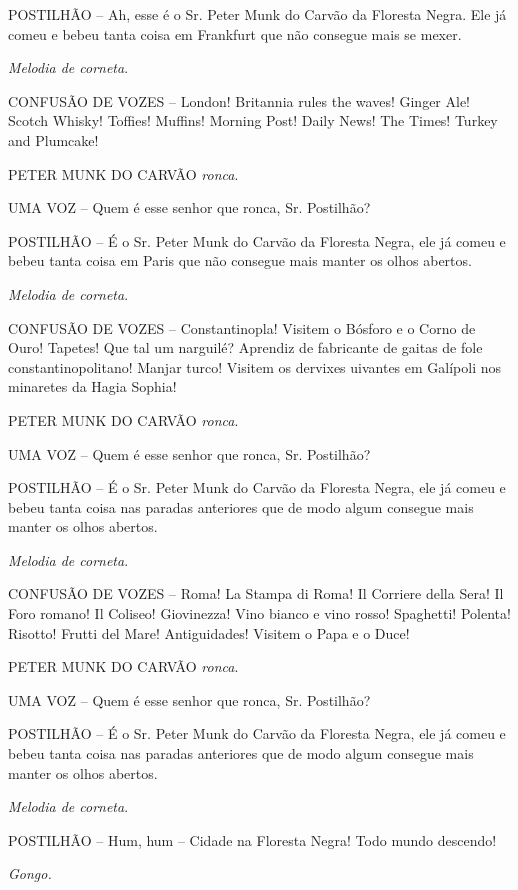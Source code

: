 POSTILHÃO -- Ah, esse é o Sr. Peter Munk do Carvão da Floresta Negra.
Ele já comeu e bebeu tanta coisa em Frankfurt que não consegue mais se
mexer.

\emph{Melodia de corneta}.

CONFUSÃO DE VOZES -- London! Britannia rules the waves! Ginger Ale!
Scotch Whisky! Toffies! Muffins! Morning Post! Daily News! The Times!
Turkey and Plumcake!

PETER MUNK DO CARVÃO \emph{ronca}.

UMA VOZ -- Quem é esse senhor que ronca, Sr. Postilhão?

POSTILHÃO -- É o Sr. Peter Munk do Carvão da Floresta Negra, ele já
comeu e bebeu tanta coisa em Paris que não consegue mais manter os olhos
abertos.

\emph{Melodia de corneta}.

CONFUSÃO DE VOZES -- Constantinopla! Visitem o Bósforo e o Corno de
Ouro! Tapetes! Que tal um narguilé? Aprendiz de fabricante de gaitas de
fole constantinopolitano! Manjar turco! Visitem os dervixes uivantes em
Galípoli nos minaretes da Hagia Sophia!

PETER MUNK DO CARVÃO \emph{ronca}.

UMA VOZ -- Quem é esse senhor que ronca, Sr. Postilhão?

POSTILHÃO -- É o Sr. Peter Munk do Carvão da Floresta Negra, ele já
comeu e bebeu tanta coisa nas paradas anteriores que de modo algum
consegue mais manter os olhos abertos.

\emph{Melodia de corneta}.

CONFUSÃO DE VOZES -- Roma! La Stampa di Roma! Il Corriere della Sera! Il
Foro romano! Il Coliseo! Giovinezza! Vino bianco e vino rosso!
Spaghetti! Polenta! Risotto! Frutti del Mare! Antiguidades! Visitem o
Papa e o Duce!

PETER MUNK DO CARVÃO \emph{ronca}.

UMA VOZ -- Quem é esse senhor que ronca, Sr. Postilhão?

POSTILHÃO -- É o Sr. Peter Munk do Carvão da Floresta Negra, ele já
comeu e bebeu tanta coisa nas paradas anteriores que de modo algum
consegue mais manter os olhos abertos.

\emph{Melodia de corneta}.

POSTILHÃO -- Hum, hum -- Cidade na Floresta Negra! Todo mundo descendo!

\emph{Gongo.}

